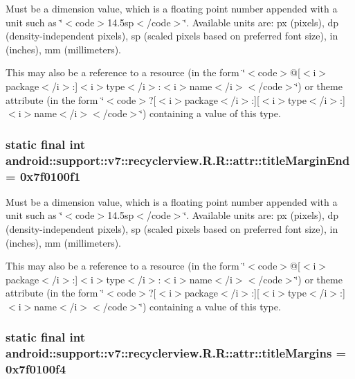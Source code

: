 Must be a dimension value, which is a floating point number appended with a unit such as \char`\"{}$<$code$>$14.5sp$<$/code$>$\char`\"{}. Available units are: px (pixels), dp (density-independent pixels), sp (scaled pixels based on preferred font size), in (inches), mm (millimeters). 

This may also be a reference to a resource (in the form \char`\"{}$<$code$>$@\mbox{[}$<$i$>$package$<$/i$>$:\mbox{]}$<$i$>$type$<$/i$>$:$<$i$>$name$<$/i$>$$<$/code$>$\char`\"{}) or theme attribute (in the form \char`\"{}$<$code$>$?\mbox{[}$<$i$>$package$<$/i$>$:\mbox{]}\mbox{[}$<$i$>$type$<$/i$>$:\mbox{]}$<$i$>$name$<$/i$>$$<$/code$>$\char`\"{}) containing a value of this type. \hypertarget{classandroid_1_1support_1_1v7_1_1recyclerview_1_1_r_1_1attr_ccf269ea34a19027343c20837fe270c5}{
\subsubsection[{titleMarginEnd}]{\setlength{\rightskip}{0pt plus 5cm}static final int android::support::v7::recyclerview.R.R::attr::titleMarginEnd = 0x7f0100f1}}
\label{classandroid_1_1support_1_1v7_1_1recyclerview_1_1_r_1_1attr_ccf269ea34a19027343c20837fe270c5}


Must be a dimension value, which is a floating point number appended with a unit such as \char`\"{}$<$code$>$14.5sp$<$/code$>$\char`\"{}. Available units are: px (pixels), dp (density-independent pixels), sp (scaled pixels based on preferred font size), in (inches), mm (millimeters). 

This may also be a reference to a resource (in the form \char`\"{}$<$code$>$@\mbox{[}$<$i$>$package$<$/i$>$:\mbox{]}$<$i$>$type$<$/i$>$:$<$i$>$name$<$/i$>$$<$/code$>$\char`\"{}) or theme attribute (in the form \char`\"{}$<$code$>$?\mbox{[}$<$i$>$package$<$/i$>$:\mbox{]}\mbox{[}$<$i$>$type$<$/i$>$:\mbox{]}$<$i$>$name$<$/i$>$$<$/code$>$\char`\"{}) containing a value of this type. \hypertarget{classandroid_1_1support_1_1v7_1_1recyclerview_1_1_r_1_1attr_e4601faed0228211460275a537550857}{
\subsubsection[{titleMargins}]{\setlength{\rightskip}{0pt plus 5cm}static final int android::support::v7::recyclerview.R.R::attr::titleMargins = 0x7f0100f4}}
\label{classandroid_1_1support_1_1v7_1_1recyclerview_1_1_r_1_1attr_e4601faed0228211460275a537550857}



